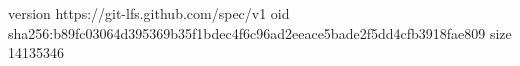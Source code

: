 version https://git-lfs.github.com/spec/v1
oid sha256:b89fc03064d395369b35f1bdec4f6c96ad2eeace5bade2f5dd4cfb3918fae809
size 14135346
